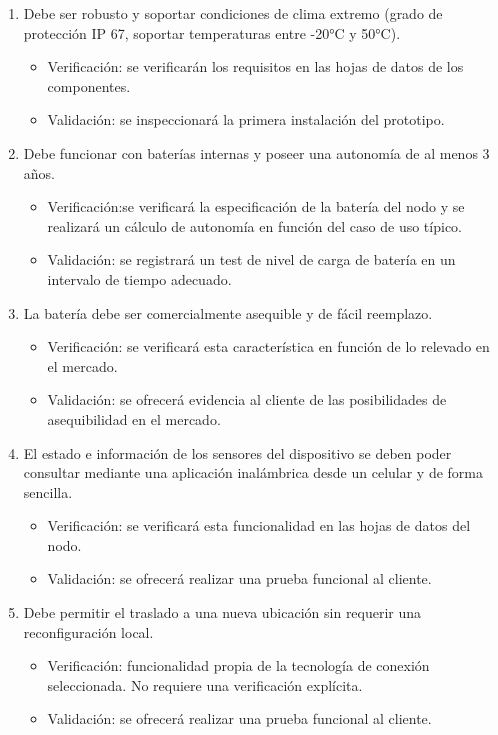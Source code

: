 \documentclass[
11pt, %
]{charter}
\begin{document}
\begin{enumerate}
\begin{enumerate}
			\item Debe ser robusto y soportar condiciones de clima extremo (grado de protección IP 67, soportar temperaturas entre -20°C y 50°C).
			\begin{itemize}
				\item Verificación: se verificarán los requisitos en las hojas de datos de los componentes.
				\item Validación: se inspeccionará la primera instalación del prototipo.
			\end{itemize}
			\item Debe funcionar con baterías internas y poseer una autonomía de al menos 3 años.
			\begin{itemize}
				\item Verificación:se verificará la especificación de la batería del nodo y se realizará un cálculo de autonomía en función del caso de uso típico.
				\item Validación: se registrará un test de nivel de carga de batería en un intervalo de tiempo adecuado. 
			\end{itemize}
			\item La batería debe ser comercialmente asequible y de fácil reemplazo.
			\begin{itemize}
				\item Verificación: se verificará esta característica en función de lo relevado en el mercado.
				\item Validación: se ofrecerá evidencia al cliente de las posibilidades de  asequibilidad en el mercado.  
			\end{itemize}
			\item El estado e información de los sensores del dispositivo se deben poder consultar mediante una aplicación inalámbrica desde un celular y de forma sencilla.
			\begin{itemize}
				\item Verificación: se verificará esta funcionalidad en las hojas de datos del nodo.
				\item Validación: se ofrecerá realizar una prueba funcional al cliente.
			\end{itemize}
			\item Debe permitir el traslado a una nueva ubicación sin requerir una reconfiguración local.
			\begin{itemize}
				\item Verificación: funcionalidad propia de la tecnología de conexión seleccionada. No requiere una verificación explícita.
				\item Validación: se ofrecerá realizar una prueba funcional al cliente.

\end{itemize}
\end{enumerate}
\end{enumerate}
\end{document}
